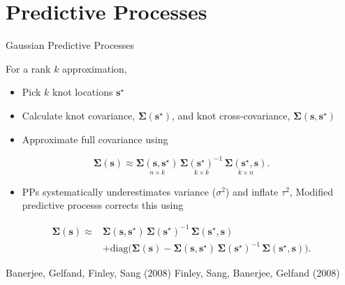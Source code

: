 \documentclass[11pt,ignorenonframetext,]{beamer}
\providecommand{\tightlist}{%
  \setlength{\itemsep}{0pt}\setlength{\parskip}{0pt}}
\begin{document}
\hypertarget{predictive-processes}{%
\section{Predictive Processes}\label{predictive-processes}}

\begin{frame}{Gaussian Predictive Processes}
\protect\hypertarget{gaussian-predictive-processes}{}

\small

For a rank \(k\) approximation,

\begin{itemize}
\tightlist
\item
  Pick \(k\) knot locations \(\symbf{s}^\star\)
\end{itemize}

\pause

\begin{itemize}
\tightlist
\item
  Calculate knot covariance, \(\symbf{\Sigma}(\symbf{s}^\star)\), and
  knot cross-covariance, \(\symbf{\Sigma}(\symbf{s}, \symbf{s}^\star)\)
\end{itemize}

\pause

\begin{itemize}
\tightlist
\item
  Approximate full covariance using
\end{itemize}

\vspace{-2mm}

\[ \symbf{\Sigma}(\symbf{s}) \approx \underset{n \times k}{\symbf{\Sigma}(\symbf{s},\symbf{s}^\star)} \, \underset{k \times k}{\symbf{\Sigma}(\symbf{s}^\star)^{-1}} \, \underset{k \times n}{\symbf{\Sigma}(\symbf{s}^\star,\symbf{s})}. \]

\pause

\begin{itemize}
\tightlist
\item
  PPs systematically underestimates variance (\(\sigma^2\)) and inflate
  \(\tau^2\), Modified predictive processs corrects this using
\end{itemize}

\vspace{-2mm}

\[
\begin{aligned}
\symbf{\Sigma}(\symbf{s}) \approx &
\symbf{\Sigma}(\symbf{s},\symbf{s}^\star) \, \symbf{\Sigma}(\symbf{s}^\star)^{-1} \, \symbf{\Sigma}(\symbf{s}^\star,\symbf{s}) \\
&+ \text{diag}\Big(\symbf{\Sigma}(\symbf{s}) - \symbf{\Sigma}(\symbf{s},\symbf{s}^\star) \, \symbf{\Sigma}(\symbf{s}^\star)^{-1} \, \symbf{\Sigma}(\symbf{s}^\star,\symbf{s})\Big).
\end{aligned}
\]

\vspace{4mm}

\footnotesize
\begin{center}
Banerjee, Gelfand, Finley, Sang (2008) \quad Finley, Sang, Banerjee, Gelfand (2008)
\end{center}

\end{frame}
\end{document}
